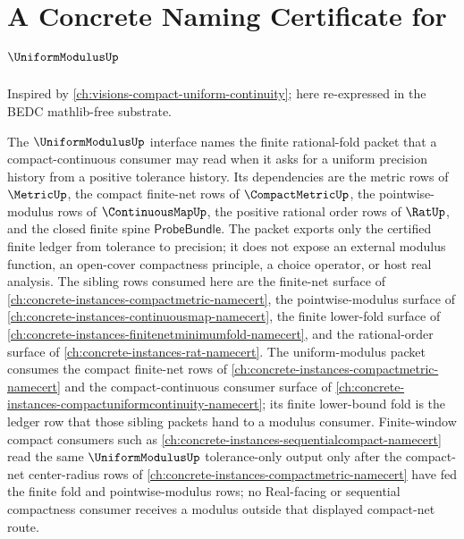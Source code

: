 \chapter{A Concrete Naming Certificate for $\UniformModulusUp$}
\label{ch:concrete-instances-uniformmodulus-namecert}

Inspired by \autoref{ch:visions-compact-uniform-continuity}; here re-expressed in the BEDC mathlib-free substrate.

The $\UniformModulusUp$ interface names the finite rational-fold packet that a compact-continuous consumer may read when it asks for a uniform precision history from a positive tolerance history. Its dependencies are the metric rows of $\MetricUp$, the compact finite-net rows of $\CompactMetricUp$, the pointwise-modulus rows of $\ContinuousMapUp$, the positive rational order rows of $\RatUp$, and the closed finite spine $\mathsf{ProbeBundle}$. The packet exports only the certified finite ledger from tolerance to precision; it does not expose an external modulus function, an open-cover compactness principle, a choice operator, or host real analysis.
The sibling rows consumed here are the finite-net surface of \autoref{ch:concrete-instances-compactmetric-namecert}, the pointwise-modulus surface of \autoref{ch:concrete-instances-continuousmap-namecert}, the finite lower-fold surface of \autoref{ch:concrete-instances-finitenetminimumfold-namecert}, and the rational-order surface of \autoref{ch:concrete-instances-rat-namecert}.
The uniform-modulus packet consumes the compact finite-net rows of \autoref{ch:concrete-instances-compactmetric-namecert} and the compact-continuous consumer surface of \autoref{ch:concrete-instances-compactuniformcontinuity-namecert}; its finite lower-bound fold is the ledger row that those sibling packets hand to a modulus consumer.
Finite-window compact consumers such as \autoref{ch:concrete-instances-sequentialcompact-namecert} read the same $\UniformModulusUp$ tolerance-only output only after the compact-net center-radius rows of \autoref{ch:concrete-instances-compactmetric-namecert} have fed the finite fold and pointwise-modulus rows; no Real-facing or sequential compactness consumer receives a modulus outside that displayed compact-net route.

